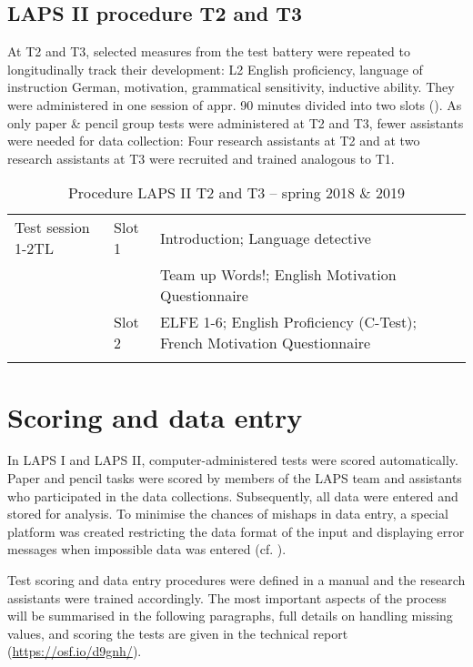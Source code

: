 \documentclass[output=paper]{langsci/langscibook}
\begin{document}
 \subsection{LAPS II procedure T2 and T3}


At T2 and T3, selected measures from the test battery were repeated to longitudinally track their development: L2 English proficiency, language of instruction German, motivation, grammatical sensitivity, inductive ability. They were administered in one session of appr. 90 minutes divided into two slots (). As only paper \& pencil group tests were administered at T2 and T3, fewer assistants were needed for data collection: Four research assistants at T2 and at two research assistants at T3 were recruited and trained analogous to T1.


\begin{table}
\begin{tabularx}{\textwidth}{llQ}
\lsptoprule
Test session 1-2TL & Slot 1 & Introduction; Language detective\\
                   &  & Team up Words!; English Motivation Questionnaire\\
                   & Slot 2 & ELFE 1-6; English Proficiency (C-Test); French Motivation Questionnaire\\
\lspbottomrule
\end{tabularx}
\caption{Procedure LAPS II T2 and T3 – spring 2018 \& 2019\label{tab:02:7}}
\end{table}

\section{Scoring and data entry}

In LAPS I and LAPS II, computer-administered tests were scored automatically. Paper and pencil tasks were scored by members of the LAPS team and assistants who participated in the data collections. Subsequently, all data were entered and stored for analysis. To minimise the chances of mishaps in data entry, a special platform was created restricting the data format of the input and displaying error messages when impossible data was entered (cf. \citealt{Vanhove2018}). 

Test scoring and data entry procedures were defined in a manual and the research assistants were trained accordingly. The most important aspects of the process will be summarised in the following paragraphs, full details on handling missing values, and scoring the tests are given in the technical report (\url{https://osf.io/d9gnh/}).
\end{document}
